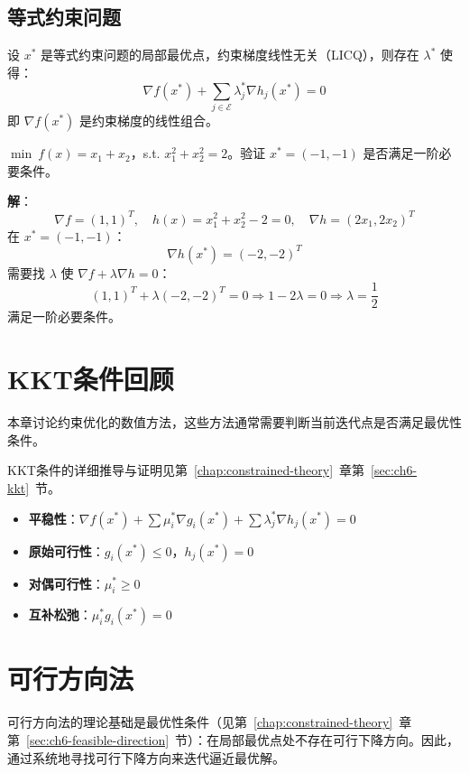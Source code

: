 \subsection{等式约束问题}

\begin{theorem}[等式约束的一阶条件]
设 $x^*$ 是等式约束问题的局部最优点，约束梯度线性无关（LICQ），则存在 $\lambda^*$ 使得：
\[
\nabla f(x^*) + \sum_{j \in \mathcal{E}} \lambda_j^* \nabla h_j(x^*) = 0
\]
即 $\nabla f(x^*)$ 是约束梯度的线性组合。
\end{theorem}

\begin{example}[验证最优性条件]
$\min\ f(x) = x_1 + x_2$，s.t. $x_1^2 + x_2^2 = 2$。验证 $x^* = (-1, -1)$ 是否满足一阶必要条件。

\textbf{解}：
\[
\nabla f = (1, 1)^T,\quad h(x) = x_1^2 + x_2^2 - 2 = 0,\quad \nabla h = (2x_1, 2x_2)^T
\]
在 $x^* = (-1, -1)$：
\[
\nabla h(x^*) = (-2, -2)^T
\]
需要找 $\lambda$ 使 $\nabla f + \lambda \nabla h = 0$：
\[
(1, 1)^T + \lambda(-2, -2)^T = 0 \Rightarrow 1 - 2\lambda = 0 \Rightarrow \lambda = \frac{1}{2}
\]
满足一阶必要条件。
\end{example}

\section{KKT条件回顾}\label{sec:ch7-kkt-review}

本章讨论约束优化的数值方法，这些方法通常需要判断当前迭代点是否满足最优性条件。
\begin{conceptbox}[KKT条件速查]
KKT条件的详细推导与证明见第~\ref{chap:constrained-theory}~章第~\ref{sec:ch6-kkt}~节。
\begin{itemize}
    \item \textbf{平稳性}：$\nabla f(x^*) + \sum \mu_i^* \nabla g_i(x^*) + \sum \lambda_j^* \nabla h_j(x^*) = 0$
    \item \textbf{原始可行性}：$g_i(x^*) \leq 0$，$h_j(x^*) = 0$
    \item \textbf{对偶可行性}：$\mu_i^* \geq 0$
    \item \textbf{互补松弛}：$\mu_i^* g_i(x^*) = 0$
\end{itemize}
\end{conceptbox}
\section{可行方向法}\label{sec:ch7-feasible-direction}

可行方向法的理论基础是最优性条件（见第~\ref{chap:constrained-theory}~章第~\ref{sec:ch6-feasible-direction}~节）：在局部最优点处不存在可行下降方向。因此，通过系统地寻找可行下降方向来迭代逼近最优解。

